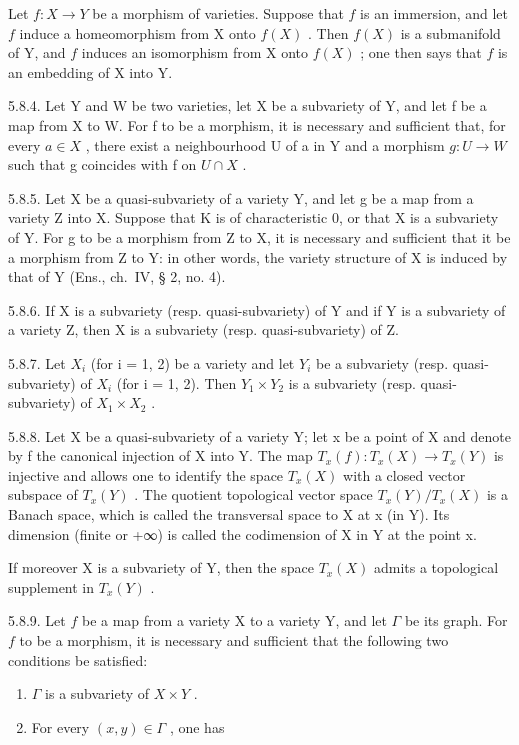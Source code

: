 Let \(f:X\to Y\) be a morphism of varieties. Suppose that \(f\) is an immersion, and let \(f\) induce a homeomorphism from X onto \(f(X)\) . Then \(f(X)\) is a submanifold of Y, and \(f\) induces an isomorphism from X onto \(f(X)\) ; one then says that \(f\) is an embedding of X into Y.

5.8.4. Let Y and W be two varieties, let X be a subvariety of Y, and let f be a map from X to W. For f to be a morphism, it is necessary and sufficient that, for every \(a \in X\) , there exist a neighbourhood U of a in Y and a morphism \(g : U \to W\) such that g coincides with f on \(U \cap X\) .

5.8.5. Let X be a quasi-subvariety of a variety Y, and let g be a map from a variety Z into X. Suppose that K is of characteristic 0, or that X is a subvariety of Y. For g to be a morphism from Z to X, it is necessary and sufficient that it be a morphism from Z to Y: in other words, the variety structure of X is induced by that of Y (Ens., ch.~IV, § 2, no. 4).

5.8.6. If X is a subvariety (resp. quasi-subvariety) of Y and if Y is a subvariety of a variety Z, then X is a subvariety (resp. quasi-subvariety) of Z.

5.8.7. Let \(X_{i}\) (for i = 1, 2) be a variety and let \(Y_{i}\) be a subvariety (resp. quasi-subvariety) of \(X_{i}\) (for i = 1, 2). Then \(Y_{1} \times Y_{2}\) is a subvariety (resp. quasi-subvariety) of \(X_{1} \times X_{2}\) .

5.8.8. Let X be a quasi-subvariety of a variety Y; let x be a point of X and denote by f the canonical injection of X into Y. The map \(T_{x}(f):T_{x}(X)\to T_{x}(Y)\) is injective and allows one to identify the space \(T_{x}(X)\) with a closed vector subspace of \(T_{x}(Y)\) . The quotient topological vector space \(T_{x}(Y)/T_{x}(X)\) is a Banach space, which is called the transversal space to X at x (in Y). Its dimension (finite or +∞) is called the codimension of X in Y at the point x.

If moreover X is a subvariety of Y, then the space \(T_{x}(X)\) admits a topological supplement in \(T_{x}(Y)\) .

5.8.9. Let \(f\) be a map from a variety X to a variety Y, and let \(\Gamma\) be its graph. For \(f\) to be a morphism, it is necessary and sufficient that the following two conditions be satisfied:

\begin{enumerate}
\def\labelenumi{(\roman{enumi})}
\item
  \(\Gamma\) is a subvariety of \(X \times Y\) .
\item
  For every \((x, y) \in \Gamma\) , one has
\end{enumerate}


